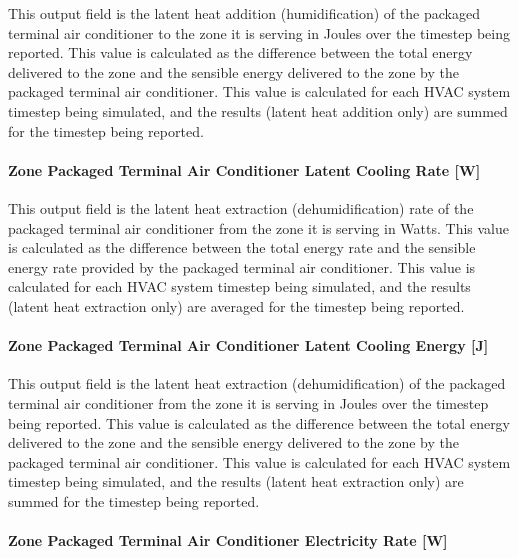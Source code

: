 This output field is the latent heat addition (humidification) of the packaged terminal air conditioner to the zone it is serving in Joules over the timestep being reported. This value is calculated as the difference between the total energy delivered to the zone and the sensible energy delivered to the zone by the packaged terminal air conditioner. This value is calculated for each HVAC system timestep being simulated, and the results (latent heat addition only) are summed for the timestep being reported.

\paragraph{Zone Packaged Terminal Air Conditioner Latent Cooling Rate {[}W{]}}\label{zone-packaged-terminal-air-conditioner-latent-cooling-rate-w}

This output field is the latent heat extraction (dehumidification) rate of the packaged terminal air conditioner from the zone it is serving in Watts. This value is calculated as the difference between the total energy rate and the sensible energy rate provided by the packaged terminal air conditioner. This value is calculated for each HVAC system timestep being simulated, and the results (latent heat extraction only) are averaged for the timestep being reported.

\paragraph{Zone Packaged Terminal Air Conditioner Latent Cooling Energy {[}J{]}}\label{zone-packaged-terminal-air-conditioner-latent-cooling-energy-j}

This output field is the latent heat extraction (dehumidification) of the packaged terminal air conditioner from the zone it is serving in Joules over the timestep being reported. This value is calculated as the difference between the total energy delivered to the zone and the sensible energy delivered to the zone by the packaged terminal air conditioner. This value is calculated for each HVAC system timestep being simulated, and the results (latent heat extraction only) are summed for the timestep being reported.

\paragraph{Zone Packaged Terminal Air Conditioner Electricity Rate {[}W{]}}\label{zone-packaged-terminal-air-conditioner-electric-power-w}

